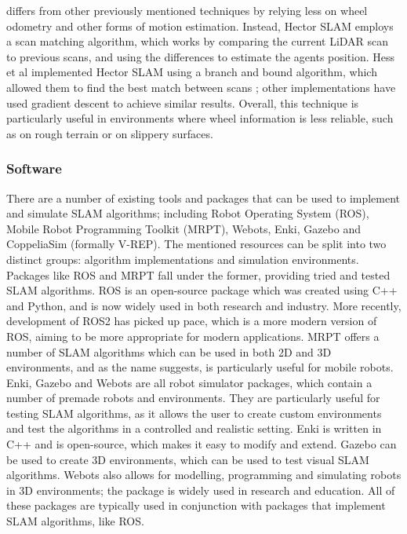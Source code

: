 \documentclass[12pt]{article}
\begin{document}
differs from other previously mentioned techniques by relying less on wheel odometry and other forms of motion estimation. Instead,
Hector SLAM employs a scan matching algorithm, which works by comparing the current LiDAR scan to previous scans, and using the
differences to estimate the agents position. Hess et al implemented Hector SLAM using a branch and bound algorithm, which allowed
them to find the best match between scans \cite{Hector_SLAM}; other implementations have used gradient descent to achieve similar
results. Overall, this technique is particularly useful in environments where wheel information is less reliable, such as on rough terrain
or on slippery surfaces. \\

\subsubsection{Software}
There are a number of existing tools and packages that can be used to implement and simulate SLAM algorithms; including Robot Operating System (ROS),
Mobile Robot Programming Toolkit (MRPT), Webots, Enki, Gazebo and CoppeliaSim (formally V-REP). The mentioned resources can be split into
two distinct groups: algorithm implementations and simulation environments. Packages like ROS and MRPT fall under the former, providing tried
and tested SLAM algorithms. ROS is an open-source package which was created using C++ and Python, and is now widely used in both research
and industry. More recently, development of ROS2 has picked up pace, which is a more modern version of ROS, aiming to be more appropriate
for modern applications. MRPT offers a number of SLAM algorithms which can be used in both 2D and 3D environments, and as the name suggests,
is particularly useful for mobile robots.\\
Enki, Gazebo and Webots are all robot simulator packages, which contain a number of premade robots and environments. They are particularly
useful for testing SLAM algorithms, as it allows the user to create custom environments and test the algorithms in a controlled and realistic
setting. Enki is written in C++ and is open-source, which makes it easy to modify and extend. Gazebo can be used to create 3D environments,
which can be used to test visual SLAM algorithms. Webots also allows for modelling, programming and simulating robots in 3D environments;
the package is widely used in research and education. All of these packages are typically used in conjunction with packages that implement
SLAM algorithms, like ROS.\\
\end{document}

